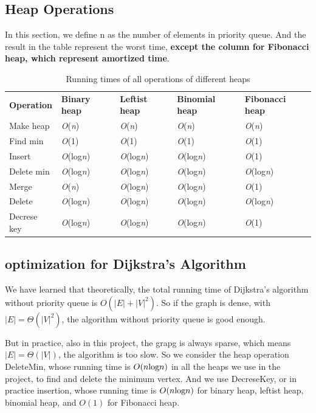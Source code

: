 \documentclass[12pt]{article}
\begin{document}
    \subsection{Heap Operations}
    In this section, we define n as the number of elements in 
    priority queue. And the result in the table represent the 
    worst time, \textbf{except the column for Fibonacci heap, which
    represent amortized time}. 
    \begin{table}[h]
        \centering
		\begin{tabular}{l l l l l}
			
			\textbf{Operation} & \textbf{Binary heap} & \textbf{Leftist heap} & \textbf{Binomial heap} & \textbf{Fibonacci heap}\\
			
			Make heap    & \emph{O}(\emph{n}) & \emph{O}(\emph{n}) & \emph{O}(\emph{n}) & \emph{O}(\emph{n})\\
			Find min     & \emph{O}(1)        & \emph{O}(1)        & \emph{O}(1)        & \emph{O}(1)\\
			Insert       & \emph{O}(log\emph{n}) & \emph{O}(log\emph{n}) & \emph{O}(log\emph{n}) & \emph{O}(1)\\
            Delete min   & \emph{O}(log\emph{n}) & \emph{O}(log\emph{n}) & \emph{O}(log\emph{n}) & \emph{O}(log\emph{n})\\
            Merge        & \emph{O}(\emph{n}) & \emph{O}(log\emph{n}) & \emph{O}(log\emph{n}) & \emph{O}(1)\\
            Delete       & \emph{O}(log\emph{n}) & \emph{O}(log\emph{n}) & \emph{O}(log\emph{n}) & \emph{O}(log\emph{n})\\
            Decrese key  & \emph{O}(log\emph{n}) & \emph{O}(log\emph{n}) & \emph{O}(log\emph{n}) & \emph{O}(1)
		\end{tabular}
		\caption{Running times of all operations of different heaps}
	\end{table}
    \subsection{optimization for Dijkstra's Algorithm}
    We have learned that theoretically, the total running time of 
    Dijkstra's algorithm without priority queue is $O(|E|+|V|^{2})$. 
    So if the graph is dense, with $|E| = \Theta(|V|^{2})$, the algorithm 
    without priority queue is good enough.

    But in practice, also in this project, the grapg is always sparse, 
    which means $|E| = \Theta(|V|)$, the algorithm is too slow. 
    So we consider the heap operation DeleteMin, whose running time is 
    $O(n\textup{log}n)$ in all the heaps we use in the project, to find and delete the
    minimum vertex. And we use DecreseKey, or in practice insertion, whose 
    running time is $O(n\textup{log}n)$ for binary heap, leftist heap,  
    binomial heap, and $O(1)$ for Fibonacci heap.
\end{document}
